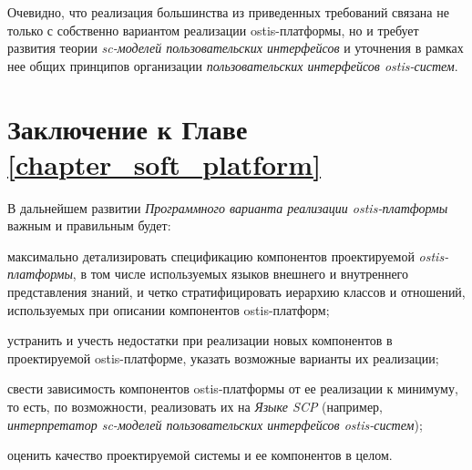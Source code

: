 Очевидно, что реализация большинства из приведенных требований связана не только с собственно вариантом реализации ostis-платформы, но и требует развития теории \textit{sc-моделей пользовательских интерфейсов} и уточнения в рамках нее общих принципов организации \textit{пользовательских интерфейсов ostis-систем}.

\section*{Заключение к Главе \ref{chapter_soft_platform}}
\label{sec_soft_platform_plans_and_tasks}

В дальнейшем развитии \textit{Программного варианта реализации ostis-платформы} важным и правильным будет:
\begin{textitemize}
    \item максимально детализировать спецификацию компонентов проектируемой \textit{ostis-платформы}, в том числе используемых языков внешнего и внутреннего представления знаний, и четко стратифицировать иерархию классов и отношений, используемых при описании компонентов ostis-платформ;
    \item устранить и учесть недостатки при реализации новых компонентов в проектируемой ostis-платформе, указать возможные варианты их реализации;
    \item свести зависимость компонентов ostis-платформы от ее реализации к минимуму, то есть, по возможности, реализовать их на \textit{Языке SCP} (например, \textit{интерпретатор sc-моделей пользовательских интерфейсов ostis-систем});
    \item оценить качество проектируемой системы и ее компонентов в целом.
\end{textitemize}

